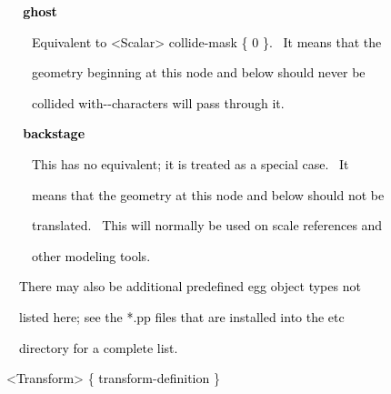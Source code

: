 \documentclass[a4paper]{article}
\newcommand\textstyleOOoComputerKeyWord[1]{\textrm{\textcolor[rgb]{0.0,0.0,0.5019608}{#1}}}
\newcommand\textstyleOOoAssemblerSpecialChar[1]{\textrm{\textcolor[rgb]{0.0,0.5019608,0.0}{#1}}}
\newcommand\textstyleOOoAssemblerIdent[1]{\textrm{\textcolor{black}{#1}}}
\begin{document}
\bigskip

{\bfseries
\hypertarget{RefHeading7720869075401}{}\textstyleOOoComputerKeyWord{\textcolor{black}{\ \ \ \ ghost}}}


\bigskip

{\color{black}
\textstyleOOoComputerKeyWord{\textcolor{black}{\ \ \ \ \ \ Equivalent to {\textless}Scalar{\textgreater} collide-mask \{
0 \}. \ It means that the}}}

{\color{black}
\textstyleOOoComputerKeyWord{\textcolor{black}{\ \ \ \ \ \ geometry beginning at this node and below should never be}}}

{\color{black}
\textstyleOOoComputerKeyWord{\textcolor{black}{\ \ \ \ \ \ collided with-{}-characters will pass through it.}}}


\bigskip

{\bfseries
\hypertarget{RefHeading7722869075401}{}\textstyleOOoComputerKeyWord{\textcolor{black}{\ \ \ \ backstage}}}


\bigskip

{\color{black}
\textstyleOOoComputerKeyWord{\textcolor{black}{\ \ \ \ \ \ This has no equivalent; it is treated as a special case.
\ It}}}

{\color{black}
\textstyleOOoComputerKeyWord{\textcolor{black}{\ \ \ \ \ \ means that the geometry at this node and below should not
be}}}

{\color{black}
\textstyleOOoComputerKeyWord{\textcolor{black}{\ \ \ \ \ \ translated. \ This will normally be used on scale references
and}}}

{\color{black}
\textstyleOOoComputerKeyWord{\textcolor{black}{\ \ \ \ \ \ other modeling tools.}}}


\bigskip

{\color{black}
\textstyleOOoComputerKeyWord{\textcolor{black}{\ \ \ \ There may also be additional predefined egg object types not}}}

{\color{black}
\textstyleOOoComputerKeyWord{\textcolor{black}{\ \ \ \ listed here; see the *.pp files that are installed into the
etc}}}

{\color{black}
\textstyleOOoComputerKeyWord{\textcolor{black}{\ \ \ \ directory for a complete list.}}}


\bigskip

{\color{black}
\textstyleOOoComputerKeyWord{\textcolor{black}{\ \ }}\textstyleOOoAssemblerSpecialChar{{\textless}}\textstyleOOoAssemblerIdent{Transform}\textstyleOOoAssemblerSpecialChar{{\textgreater}}\textstyleOOoComputerKeyWord{\textcolor{black}{
}}\textstyleOOoAssemblerSpecialChar{\{}\textstyleOOoComputerKeyWord{\textcolor{black}{
}}\textstyleOOoAssemblerIdent{transform}\textstyleOOoAssemblerSpecialChar{{}-}\textstyleOOoAssemblerIdent{definition}\textstyleOOoComputerKeyWord{\textcolor{black}{
}}\textstyleOOoAssemblerSpecialChar{\}}}
\end{document}
